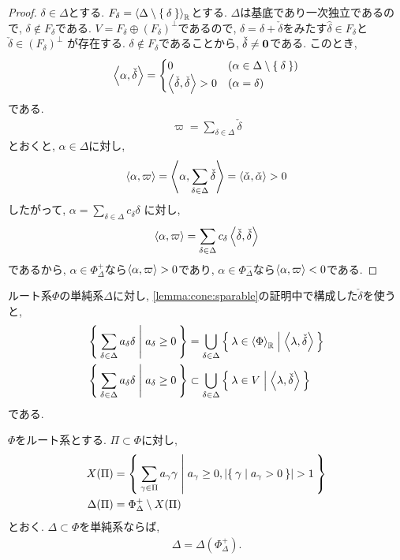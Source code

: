 \begin{proof}
  $\delta\in\Delta$とする.
  $F_\delta=\Braket{\Delta\setminus\Set{\delta}}_{\mathbb{R}}$とする.
  $\Delta$は基底であり一次独立であるので,
  $\delta\not\in F_\delta$である.
  $V=F_\delta\oplus (F_\delta)^\perp$であるので,
  $\delta=\hat\delta+\check\delta$をみたす$\hat\delta\in F_\delta$と$\check\delta\in (F_\delta)^\perp$
  が存在する.
  $\delta\not\in F_\delta$であることから,
  $\check\delta \neq\boldsymbol{0}$である.
  このとき,
  \begin{align*}
    \Braket{\alpha,\check\delta}
    =
    \begin{cases}
      0 & (\alpha\in \Delta\setminus\Set{\delta})\\
      \Braket{\check\delta,\check\delta}>0 & (\alpha=\delta)
    \end{cases}
  \end{align*}
  である.
  \begin{align*}
    \varpi=\sum_{\delta\in\Delta}\check\delta
  \end{align*}
  とおくと, $\alpha\in\Delta$に対し,
  \begin{align*}
    \Braket{\alpha,\varpi}
    =\Braket{\alpha,\sum_{\delta\in\Delta}\check\delta}
    =\Braket{\check\alpha,\check\alpha}>0
  \end{align*}
  したがって, $\alpha=\sum_{\delta\in \Delta}c_\delta \delta$
  に対し,
  \begin{align*}
    \Braket{\alpha,\varpi}=\sum_{\delta\in\Delta} c_\delta\Braket{\check\delta,\check\delta}
  \end{align*}
  であるから,
  $\alpha\in \Phi_\Delta^+$なら$\Braket{\alpha,\varpi}>0$であり,
  $\alpha\in \Phi_\Delta^-$なら$\Braket{\alpha,\varpi}<0$である.
\end{proof}
\begin{remark}
  ルート系$\Phi$の単純系$\Delta$に対し,
  \cref{lemma:cone:sparable}の証明中で構成した$\check\delta$を使うと,
  \begin{align*}
    \Set{\sum_{\delta\in\Delta}a_\delta \delta|a_\delta\geq 0}
    &= \bigcup_{\delta\in\Delta} \Set{\lambda\in \Braket{\Phi}_{\mathbb{R}}|\Braket{\lambda,\check\delta} }\\
    \Set{\sum_{\delta\in\Delta}a_\delta \delta|a_\delta\geq 0}
    &\subset\bigcup_{\delta\in\Delta} \Set{\lambda\in V |\Braket{\lambda,\check\delta} }
  \end{align*}
  である.
\end{remark}
\begin{lemma}
  \label{lem:simplesumissimplesystem:}
  $\Phi$をルート系とする.
  $\Pi\subset \Phi$に対し,
  \begin{align*}
    X(\Pi)&= \Set{\sum_{\gamma\in\Pi}a_\gamma\gamma| a_\gamma\geq 0, \numof{\Set{\gamma|a_\gamma>0}}>1}\\
    \Delta(\Pi)&= \Phi_{\Delta}^+ \setminus X(\Pi)
  \end{align*}
  とおく.
  $\Delta\subset \Phi$を単純系ならば,
  \begin{align*}
    \Delta=\Delta(\Phi_\Delta^+).
  \end{align*}
\end{lemma}
